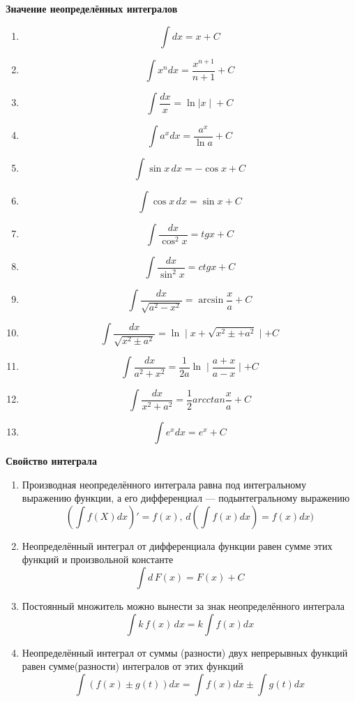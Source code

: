 \documentclass[a4paper]{article}
\begin{document}
	\newpage
	\begin{center}
	\textbf{Значение неопределённых интегралов}
	\end{center}
	\begin{enumerate} 
	\item	\[\int dx = x + C\]	 
	\item	\[\int x^{n}dx = \dfrac{x^{n+1}}{n+1} + C\]
	\item	\[\int\dfrac{dx}{x} = \ln{\mid x \mid} + C\]
	\item	\[\int a^{x}dx = \dfrac{a^{x}}{\ln a} + C\]
	\item	\[\int\sin x\,dx = -\cos x + C\]
	\item	\[\int\cos x\,dx = \sin x + C\]
	\item	\[\int\dfrac{dx}{\cos^{2}x} = tg x + C\]
	\item	\[\int\dfrac{dx}{\sin^{2}x} = ctg x + C\]
	\item	\[\int\dfrac{dx}{\sqrt{a^2 - x^2}} = \arcsin\dfrac{x}{a} + C\]
	\item	\[\int\dfrac{dx}{\sqrt{x^2 \pm a^2}} = \ln \mid x + \sqrt{x^2 \pm + a^2} \mid + C\]
	\item	\[\int\dfrac{dx}{a^2 + x^2} = \dfrac{1}{2a}\ln \mid\dfrac{a+x}{a-x}\mid + C\]
	\item	\[\int\dfrac{dx}{x^2 + a^2} = \dfrac{1}{2}arcctan\dfrac{x}{a} + C\]
	\item	\[\int e^x dx= e^x + C\]
	\end{enumerate}
	
	\newpage
	\begin{center}
		\textbf{Свойство интеграла}
	\end{center}
	\begin{enumerate}
		\item Производная неопределённого интеграла равна под интегральному выражению функции, а его дифференциал --- подынтегральному выражению \[ (\int f(X) dx)' = f(x), \, d(\int f(x)dx) = f(x)dx) \]
		\item Неопределённый интеграл от дифференциала функции равен сумме этих функций и произвольной константе \[ \int d\,F(x) = F(x) + C \] 
		\item Постоянный множитель можно вынести за знак неопределённого интеграла \[ \int k\,f(x)\,dx = k \int f(x)dx\]
		\item Неопределённый интеграл от суммы (разности) двух непрерывных функций равен сумме(разности) интегралов от этих функций \[ \int (f(x) \pm g(t))dx = \int f(x)dx \pm \int g(t)dx \]
	\end{enumerate}
	\newpage
\end{document}
